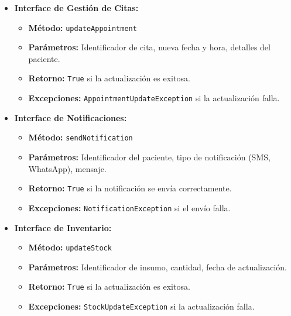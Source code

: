 \begin{itemize}
    \item \textbf{Interface de Gestión de Citas:}
    \begin{itemize}
        \item \textbf{Método:} \texttt{updateAppointment}
        \item \textbf{Parámetros:} Identificador de cita, nueva fecha y hora, detalles del paciente.
        \item \textbf{Retorno:} \texttt{True} si la actualización es exitosa.
        \item \textbf{Excepciones:} \texttt{AppointmentUpdateException} si la actualización falla.
    \end{itemize}
    \item \textbf{Interface de Notificaciones:}
    \begin{itemize}
        \item \textbf{Método:} \texttt{sendNotification}
        \item \textbf{Parámetros:} Identificador del paciente, tipo de notificación (SMS, WhatsApp), mensaje.
        \item \textbf{Retorno:} \texttt{True} si la notificación se envía correctamente.
        \item \textbf{Excepciones:} \texttt{NotificationException} si el envío falla.
    \end{itemize}
    \item \textbf{Interface de Inventario:}
    \begin{itemize}
        \item \textbf{Método:} \texttt{updateStock}
        \item \textbf{Parámetros:} Identificador de insumo, cantidad, fecha de actualización.
        \item \textbf{Retorno:} \texttt{True} si la actualización es exitosa.
        \item \textbf{Excepciones:} \texttt{StockUpdateException} si la actualización falla.
    \end{itemize}
\end{itemize}









